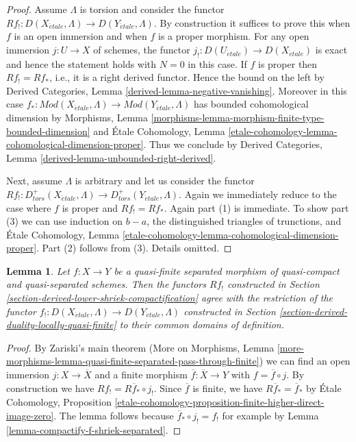 \documentclass{stacks-project}
\theoremstyle{plain}
\newtheorem{lemma}[subsection]{Lemma}
\theoremstyle{definition}
\theoremstyle{remark}
\numberwithin{equation}{subsection}
\def\etale{{\acute{e}tale}}
\begin{document}
\begin{proof}
Assume $\Lambda$ is torsion and consider the functor
$Rf_! : D(X_\etale, \Lambda) \to D(Y_\etale, \Lambda)$.
By construction it suffices to prove this when $f$ is an open immersion
and when $f$ is a proper morphism. For any open immersion $j : U \to X$
of schemes, the functor $j_! : D(U_\etale) \to D(X_\etale)$ is exact
and hence the statement holds with $N = 0$ in this case.
If $f$ is proper then $Rf_! = Rf_*$, i.e., it is a right derived
functor. Hence the bound on the left by
Derived Categories, Lemma \ref{derived-lemma-negative-vanishing}.
Moreover in this case $f_* : \textit{Mod}(X_\etale, \Lambda)
\to \textit{Mod}(Y_\etale, \Lambda)$ has bounded cohomological dimension by
Morphisms, Lemma \ref{morphisms-lemma-morphism-finite-type-bounded-dimension}
and \'Etale Cohomology, Lemma
\ref{etale-cohomology-lemma-cohomological-dimension-proper}.
Thus we conclude by
Derived Categories, Lemma \ref{derived-lemma-unbounded-right-derived}.

\medskip\noindent
Next, assume $\Lambda$ is arbitrary and let us consider the functor
$Rf_! : D^+_{tors}(X_\etale, \Lambda) \to D^+_{tors}(Y_\etale, \Lambda)$.
Again we immediately reduce to the case where $f$ is proper and
$Rf_! = Rf_*$. Again part (1) is immediate. To show part (3)
we can use induction on $b - a$, the distinguished
triangles of trunctions, and \'Etale Cohomology, Lemma
\ref{etale-cohomology-lemma-cohomological-dimension-proper}.
Part (2) follows from (3). Details omitted.
\end{proof}

\begin{lemma}
\label{lemma-Rf-shriek-for-quasi-finite}
Let $f : X \to Y$ be a quasi-finite separated morphism of quasi-compact and
quasi-separated schemes. Then the functors $Rf_!$ constructed in
Section \ref{section-derived-lower-shriek-compactification}
agree with the restriction of the functor
$f_! : D(X_\etale, \Lambda) \to D(Y_\etale, \Lambda)$
constructed in Section \ref{section-derived-duality-locally-quasi-finite}
to their common domains of definition.
\end{lemma}

\begin{proof}
By Zariski's main theorem (More on Morphisms, Lemma
\ref{more-morphisms-lemma-quasi-finite-separated-pass-through-finite})
we can find an open immersion $j : X \to \overline{X}$ and a finite morphism
$\overline{f} : \overline{X} \to Y$ with $f = \overline{f} \circ j$.
By construction we have $Rf_! = R\overline{f}_* \circ j_!$.
Since $\overline{f}$ is finite, we have $R\overline{f}_* = \overline{f}_*$
by \'Etale Cohomology, Proposition
\ref{etale-cohomology-proposition-finite-higher-direct-image-zero}.
The lemma follows because $\overline{f}_* \circ j_! = f_!$
for example by Lemma \ref{lemma-compactify-f-shriek-separated}.
\end{proof}
\end{document}
